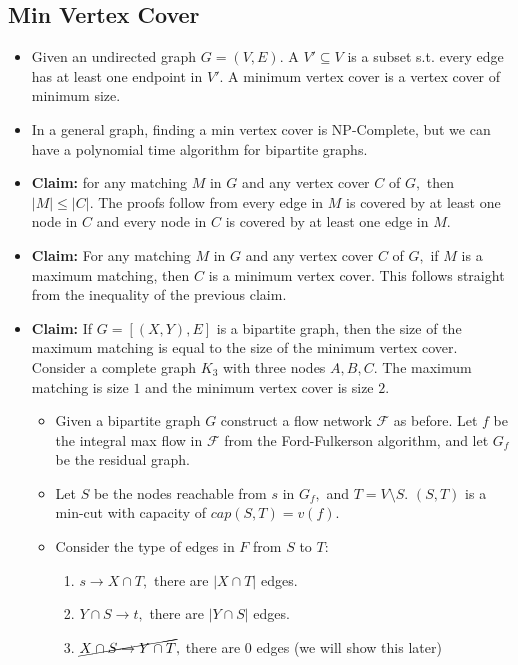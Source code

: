 \documentclass[a4paper,12pt]{article}
\begin{document}
\subsection{Min Vertex Cover}
\begin{itemize}
    \item Given an undirected graph $G=(V,E).$ A  $V'\subseteq V$ is a subset s.t. every edge has at least one endpoint in $V'.$ A minimum vertex cover is a vertex cover of minimum size.
    \item In a general graph, finding a min vertex cover is NP-Complete, but we can have a polynomial time algorithm for bipartite graphs.
    \item \textbf{Claim:} for any matching $M$ in $G$ and any vertex cover $C$ of $G,$ then $|M|\leq|C|.$ The proofs follow from every edge in $M$ is covered by at least one node in $C$ and every node in $C$ is covered by at least one edge in $M.$
    \item \textbf{Claim:} For any matching $M$ in $G$ and any vertex cover $C$ of $G,$ if $M$ is a maximum matching, then $C$ is a minimum vertex cover. This follows straight from the inequality of the previous claim.
    \item \textbf{Claim:} If $G=[(X,Y),E]$ is a bipartite graph, then the size of the maximum matching is equal to the size of the minimum vertex cover.  Consider a complete graph $K_3$ with three nodes $A,B,C.$ The maximum matching is size $1$ and the minimum vertex cover is size $2.$ \begin{itemize}
        \item Given a bipartite graph $G$ construct a flow network $\mathcal F$ as before. Let $f$ be the integral max flow in $\mathcal F$ from the Ford-Fulkerson algorithm, and let $G_f$ be the residual graph.
        \item Let $S$ be the nodes reachable from $s$ in $G_f,$ and $T=V\setminus S.$ $(S,T)$ is a min-cut with capacity of $cap(S,T)=v(f).$
        \item Consider the type of edges in $F$ from $S$ to $T:$\begin{enumerate}
            \item $s\to X\cap T,$ there are $|X\cap T|$ edges.
            \item $Y\cap S\to t,$ there are $|Y\cap S|$ edges.
            \item $\cancel{X\cap S\to Y\cap T},$ there are $0$ edges (we will show this later)
        \end{enumerate}

\end{itemize}
\end{itemize}
\end{document}
